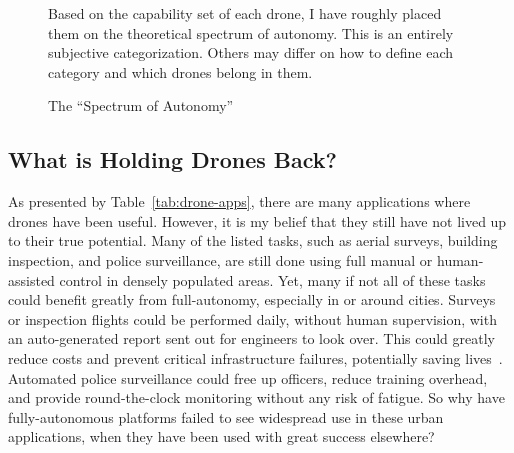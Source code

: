 \begin{figure}[]
    \begin{captext}
        \small Based on the capability set of each drone, I have roughly placed them on the theoretical spectrum of autonomy. This is an entirely subjective categorization. Others may differ on how to define each category and which drones belong in them.
    \end{captext}
    \caption{The ``Spectrum of Autonomy''}
    \label{fig:spectrum}
\end{figure}

\subsection{What is Holding Drones Back?}
\label{sec:problems}
As presented by Table~\ref{tab:drone-apps}, there are many applications where drones have been useful. However, it is my belief that they still have not lived up to their true potential. Many of the listed tasks, such as aerial surveys, building inspection, and police surveillance, are still done using full manual or human-assisted control in densely populated areas. Yet, many if not all of these tasks could benefit greatly from full-autonomy, especially in or around cities. Surveys or inspection flights could be performed daily, without human supervision, with an auto-generated report sent out for engineers to look over. This could greatly reduce costs and prevent critical infrastructure failures, potentially saving lives~\cite{Dorafshan2018}. Automated police surveillance could free up officers, reduce training overhead, and provide round-the-clock monitoring without any risk of fatigue. So why have fully-autonomous platforms failed to see widespread use in these urban applications, when they have been used with great success elsewhere?

